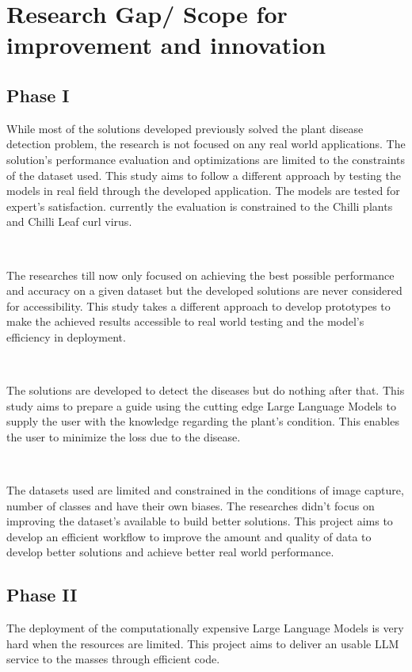 \section{Research Gap/ Scope for improvement and innovation}

\subsection{Phase I}

While most of the solutions developed previously solved the plant disease detection problem, the research is not focused on any real world applications. The solution's performance evaluation and optimizations are limited to the constraints of the dataset used. This study aims to follow a different approach by testing the models in real field through the developed application. The models are tested for expert's satisfaction. currently the evaluation is constrained to the Chilli plants and Chilli Leaf curl virus.

\

The researches till now only focused on achieving the best possible performance and accuracy on a given dataset but the developed solutions are never considered for accessibility. This study takes a different approach to develop prototypes to make the achieved results accessible to real world testing and the model's efficiency in deployment.

\

The solutions are developed to detect the diseases but do nothing after that. This study aims to prepare a guide using the cutting edge Large Language Models to supply the user with the knowledge regarding the plant's condition. This enables the user to minimize the loss due to the disease.

\

The datasets used are limited and constrained in the conditions of image capture, number of classes and have their own biases. The researches didn't focus on improving the dataset's available to build better solutions. This project aims to develop an efficient workflow to improve the amount and quality of data to develop better solutions and achieve better real world performance.


\subsection{Phase II}

The deployment of the computationally expensive Large Language Models is very hard when the resources are limited. This project aims to deliver an usable LLM service to the masses through efficient code.

